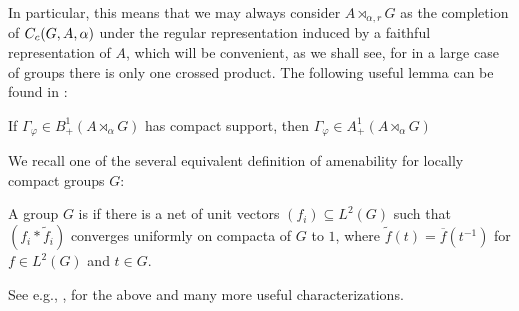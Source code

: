 In particular, this means that we may always consider $A \rtimes_{\alpha,r}G$ as the completion of $C_c(G,A,\alpha)$ under the regular representation induced by a faithful representation of $A$, which will be convenient, as we shall see, for in a large case of groups there is only one crossed product. The following useful lemma can be found in \cite[Lemma 7.7.6]{pedersenalgauto}:
\begin{lemma}
If $\Gamma_\varphi \in B_+^1(A \rtimes_\alpha G)$ has compact support, then $\Gamma_\varphi \in A_+^1(A \rtimes_\alpha G)$
\label{crossed:compactposdef}
\end{lemma}

We recall one of the several equivalent definition of amenability for locally compact groups $G$:
\begin{definition}
A group $G$ is  if there is a net of unit vectors $(f_i) \subseteq L^2(G)$ such that $(f_i \ast \tilde f_i)$ converges uniformly on compacta of $G$ to $1$, where $\tilde f (t) = \overline f(t^{-1})$ for $f \in L^2(G)$ and $t \in G$.
\end{definition}
See e.g., \cite[Appendix G]{bekka2008kazhdan}, \cite[Proposition 7.3.7 and 7.3.8]{pedersenalgauto} for the above and many more useful characterizations. 

